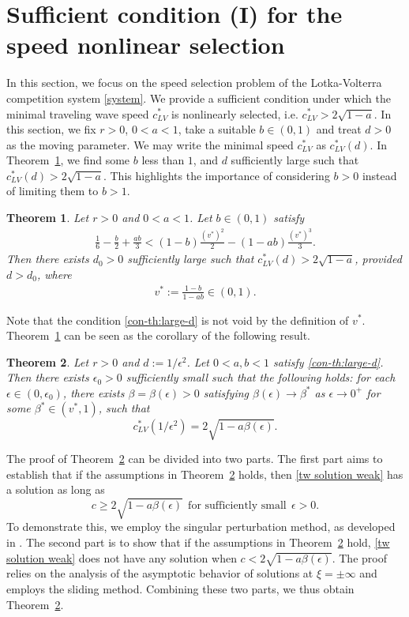 \documentclass[11pt,a4paper]{article}
\newtheorem{theorem}{\textbf{Theorem}}[section]
\numberwithin{equation}{section}
\numberwithin{figure}{section}
\newcommand\ep{\epsilon}
\newcommand\bea{\begin{eqnarray}}
\newcommand\eea{\end{eqnarray}}
\newcommand\beaa{\begin{eqnarray*}}
\newcommand\eeaa{\end{eqnarray*}}
\begin{document}
\section{Sufficient condition (I) for the speed nonlinear selection}\label{sec: sufficient condition 1}


In this section, we focus on the speed selection problem of the Lotka-Volterra competition system \eqref{system}.
We provide a sufficient condition under which the minimal traveling wave speed $c^*_{LV}$ is nonlinearly selected, i.e. $c^*_{LV}>2\sqrt{1-a}$.
In this section, we fix $r>0$, $0<a<1$, take a suitable $b\in(0,1)$ and 
treat $d>0$ as the moving parameter. We may write the minimal speed $c^*_{LV}$
as $c^*_{LV}(d)$. In Theorem~\ref{th:large-d}, we find some $b$ less than $1$, and $d$ sufficiently large such that $c^*_{LV}(d)>2\sqrt{1-a}$.
This highlights the importance of considering $b>0$ instead of limiting them to $b>1$. 


\begin{theorem}\label{th:large-d}
Let $r>0$ and $0<a<1$. Let $b\in(0,1)$ satisfy
\bea\label{con-th:large-d}
\frac{1}{6}-\frac{b}{2}+\frac{ab}{3}<(1-b)\frac{(v^*)^2}{2}-(1-ab)\frac{(v^*)^3}{3}.
\eea
Then there exists $d_0>0$ sufficiently large such that $c^*_{LV}(d)>2\sqrt{1-a}$, provided $d>d_0$, where
\beaa
v^{*}:=\frac{1-b}{1-ab}\in(0,1).
\eeaa
\end{theorem}

Note that the condition \eqref{con-th:large-d} is not void by the definition of $v^*$.
Theorem~\ref{th:large-d} can be seen as the corollary of the following result.


\begin{theorem}\label{th:singular perturbation}
Let $r>0$ and $d:=1/\epsilon^2$. Let $0<a,b<1$ satisfy \eqref{con-th:large-d}.
Then there exists $\epsilon_0>0$ sufficiently small such that the following holds:
for each $\epsilon\in(0,\epsilon_0)$, there exists
$\beta=\beta(\epsilon)>0$ satisfying $\beta(\epsilon)\to \beta^*$ as $\epsilon\to 0^+$ for some $\beta^*\in(v^*,1)$, such that
$$c^*_{LV}(1/\epsilon^2)=2\sqrt{1-a\beta(\ep)}.$$
\end{theorem}

The proof of Theorem~\ref{th:singular perturbation} can be divided into two parts. The first part aims to establish that
if the assumptions in Theorem~\ref{th:singular perturbation} holds,
then \eqref{tw solution weak} has a solution as long as
$$c\geq 2\sqrt{1-a\beta(\ep)}\ \ \text{for sufficiently small}\ \ \ep>0.$$
To demonstrate this, we employ the singular perturbation method, as developed in \cite{Fife1976,Hosono Mimura 1982,Hosono 2003}.
The second part is to show that if the assumptions in Theorem~\ref{th:singular perturbation} hold,
\eqref{tw solution weak} does not have any solution when
$c<2\sqrt{1-a\beta(\ep)}$.
The proof relies on the analysis of the asymptotic behavior of solutions at $\xi=\pm\infty$ and employs the sliding method.
Combining these two parts, we thus obtain Theorem~\ref{th:singular perturbation}.
\end{document}
